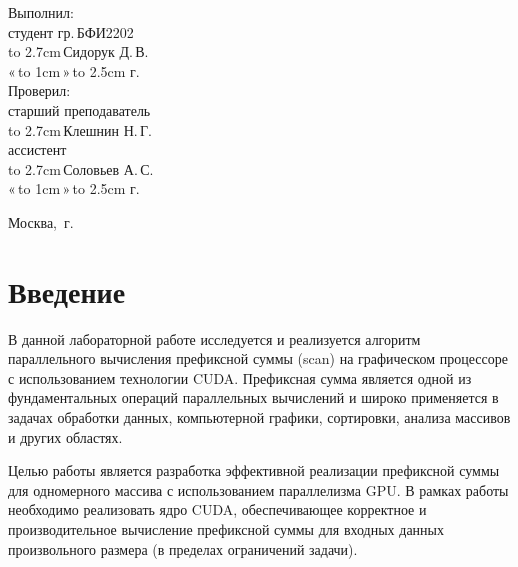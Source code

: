 \documentclass[14pt]{extarticle}
\makeatletter
\newcommand{\hrf}[1]{\hbox to #1{\hrulefill}} %
\newcounter{sectionc} %
\newcommand{\numbersections}{\renewcommand{\Hy@numberline}[1]{##1~}}
\newcommand{\nonumbersections}{\renewcommand{\Hy@numberline}[1]{}}
\let\oldsection\section
\renewcommand{\section}{\numbersections\oldsection}
\let\oldsectionc\sectionc
\renewcommand{\sectionc}{\nonumbersections\oldsectionc}
\renewcommand\tableofcontents{
\pdfbookmark[sectionc]{\contentsname}{toc} %
\sectionc*{\contentsname
	\@mkboth{\contentsname}{\contentsname}}
\@starttoc{toc}
}
\makeatother
\begin{document}
\vfill %

\hfill %
\begin{minipage}{0.45\textwidth} %
	Выполнил:\\[2mm]
	студент гр.\,БФИ2202\\[2mm]
	\hrf{2.7cm}\,Сидорук Д.\,В.\\[2mm]
	«\,\hrf{1cm}\,»\,\hrf{2.5cm}\,\the\year{}\,г.\\[5mm]
	
	Проверил:\\[2mm]
	старший преподаватель\\[2mm]
	\hrf{2.7cm}\,Клешнин Н.\,Г.\\[2mm]
	ассистент\\[2mm]
	\hrf{2.7cm}\,Соловьев А.\,С.\\[2mm]
	«\,\hrf{1cm}\,»\,\hrf{2.5cm}\,\the\year{}\,г.
\end{minipage}%

\vfill

\centerline{Москва, \the\year{}\,г.} %
\thispagestyle{empty} %
\newpage %
\tableofcontents %
\newpage %

\section{Введение}

В данной лабораторной работе исследуется и реализуется алгоритм параллельного вычисления префиксной суммы (scan) на графическом процессоре с использованием технологии CUDA. Префиксная сумма является одной из фундаментальных операций параллельных вычислений и широко применяется в задачах обработки данных, компьютерной графики, сортировки, анализа массивов и других областях.

Целью работы является разработка эффективной реализации префиксной суммы для одномерного массива с использованием параллелизма GPU. В рамках работы необходимо реализовать ядро CUDA, обеспечивающее корректное и производительное вычисление префиксной суммы для входных данных произвольного размера (в пределах ограничений задачи).
\end{document}
